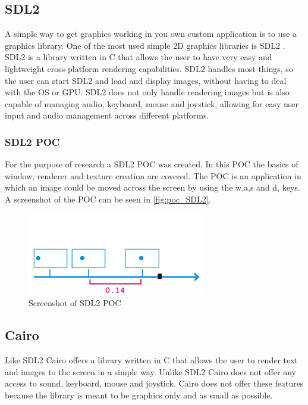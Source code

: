 \documentclass{article} %
\begin{document}
\subsection{SDL2}
A simple way to get graphics working in you own custom application is to use a graphics library.
One of the most used simple 2D graphics libraries is SDL2 \cite{sdl2}.
SDL2 is a library written in C that allows the user to have very easy and lightweight cross-platform rendering capabilities.
SDL2 handles most things, so the user can start SDL2 and load and display images, without having to deal with the OS or GPU.
SDL2 does not only handle rendering images but is also capable of managing audio, keyboard, mouse and joystick, allowing for easy user input and audio management across different platforms.

\subsubsection{SDL2 POC}
For the purpose of research a SDL2 POC was created. In this POC the basics of window, renderer and texture creation are covered.
The POC is an application in which an image could be moved across the screen by using the w,a,s and d, keys.
A screenshot of the POC can be seen in \autoref{fig:poc_SDL2}.

\begin{figure}[h!]
	\centering
	\includegraphics[width=0.7\textwidth]{pos_SDL2_screenshot.png}
	\caption{Screenshot of SDL2 POC}
	\label{fig:poc_SDL2}
\end{figure}

\subsection{Cairo}
Like SDL2 Cairo \cite{cairo}  offers a library written in C that allows the user to render text and images to the screen in a simple way.
Unlike SDL2 Cairo does not offer any access to sound, keyboard, mouse and joystick.
Cairo does not offer these features because the library is meant to be graphics only and as small as possible.
\end{document}
